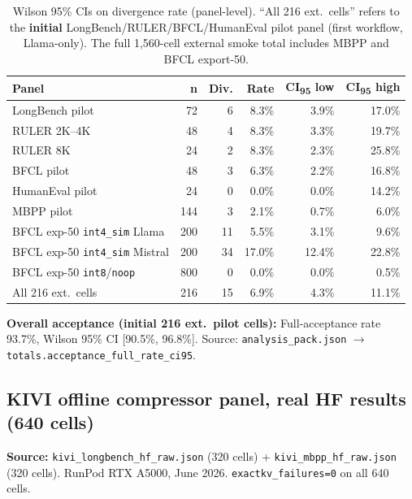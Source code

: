 \documentclass[11pt]{article}
\begin{document}
\begin{table}[htbp]
\centering\small
\renewcommand{\arraystretch}{1.05}
\begin{tabular}{lrrrrr}
\toprule
\textbf{Panel} & \textbf{n} & \textbf{Div.} & \textbf{Rate} & \textbf{CI\textsubscript{95} low} & \textbf{CI\textsubscript{95} high} \\ \midrule
LongBench pilot & 72 & 6 & 8.3\% & 3.9\% & 17.0\% \\
RULER 2K--4K & 48 & 4 & 8.3\% & 3.3\% & 19.7\% \\
RULER 8K & 24 & 2 & 8.3\% & 2.3\% & 25.8\% \\
BFCL pilot & 48 & 3 & 6.3\% & 2.2\% & 16.8\% \\
HumanEval pilot & 24 & 0 & 0.0\% & 0.0\% & 14.2\% \\
MBPP pilot & 144 & 3 & 2.1\% & 0.7\% & 6.0\% \\
BFCL exp-50 \texttt{int4\_sim} Llama & 200 & 11 & 5.5\% & 3.1\% & 9.6\% \\
BFCL exp-50 \texttt{int4\_sim} Mistral & 200 & 34 & 17.0\% & 12.4\% & 22.8\% \\
BFCL exp-50 \texttt{int8}/\texttt{noop} & 800 & 0 & 0.0\% & 0.0\% & 0.5\% \\
\midrule
All 216 ext.\ cells & 216 & 15 & 6.9\% & 4.3\% & 11.1\% \\
\bottomrule
\end{tabular}
\caption{Wilson 95\% CIs on divergence rate (panel-level).
``All 216 ext.\ cells'' refers to the \textbf{initial} LongBench/RULER/BFCL/HumanEval pilot panel (first workflow, Llama-only). The full 1,560-cell external smoke total includes MBPP and BFCL export-50.}
\label{tab:ci-divergence}
\end{table}

\textbf{Overall acceptance (initial 216 ext.\ pilot cells):} Full-acceptance rate 93.7\%, Wilson 95\% CI [90.5\%, 96.8\%].
Source: \texttt{analysis\_pack.json} $\to$ \texttt{totals.acceptance\_full\_rate\_ci95}.

\subsection{KIVI offline compressor panel, real HF results (640 cells)}
\textbf{Source:} \texttt{kivi\_longbench\_hf\_raw.json} (320 cells) + \texttt{kivi\_mbpp\_hf\_raw.json} (320 cells).
RunPod RTX A5000, June 2026. \texttt{exactkv\_failures=0} on all 640 cells.
\end{document}
